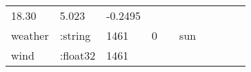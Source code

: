 \documentclass[]{article}
\begin{document}
\begin{longtable}[]{@{}llllllllll@{}}
\begin{minipage}[t]{0.07\columnwidth}
18.30\strut
\end{minipage} & \begin{minipage}[t]{0.12\columnwidth}\raggedright\strut
5.023\strut
\end{minipage} & \begin{minipage}[t]{0.05\columnwidth}\raggedright\strut
-0.2495\strut
\end{minipage}\tabularnewline
\begin{minipage}[t]{0.08\columnwidth}\raggedright\strut
weather\strut
\end{minipage} & \begin{minipage}[t]{0.11\columnwidth}\raggedright\strut
:string\strut
\end{minipage} & \begin{minipage}[t]{0.06\columnwidth}\raggedright\strut
1461\strut
\end{minipage} & \begin{minipage}[t]{0.07\columnwidth}\raggedright\strut
0\strut
\end{minipage} & \begin{minipage}[t]{0.07\columnwidth}\raggedright\strut
\strut
\end{minipage} & \begin{minipage}[t]{0.04\columnwidth}\raggedright\strut
sun\strut
\end{minipage} & \begin{minipage}[t]{0.07\columnwidth}\raggedright\strut
\strut
\end{minipage} & \begin{minipage}[t]{0.07\columnwidth}\raggedright\strut
\strut
\end{minipage} & \begin{minipage}[t]{0.12\columnwidth}\raggedright\strut
\strut
\end{minipage} & \begin{minipage}[t]{0.05\columnwidth}\raggedright\strut
\strut
\end{minipage}\tabularnewline
\begin{minipage}[t]{0.08\columnwidth}\raggedright\strut
wind\strut
\end{minipage} & \begin{minipage}[t]{0.11\columnwidth}\raggedright\strut
:float32\strut
\end{minipage} & \begin{minipage}[t]{0.06\columnwidth}\raggedright\strut
1461\strut
\end{minipage} & \begin{minipage}[t]{0.07\columnwidth}\raggedright\strut

\end{minipage}
\end{longtable}
\end{document}
